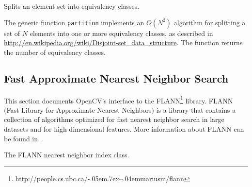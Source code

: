 Splits an element set into equivalency classes.

\begin{description}
\end{description}

The generic function \texttt{partition} implements an $O(N^2)$ algorithm for
splitting a set of $N$ elements into one or more equivalency classes, as described in \url{http://en.wikipedia.org/wiki/Disjoint-set_data_structure}. The function
returns the number of equivalency classes.

\subsection{Fast Approximate Nearest Neighbor Search}

\def\urltilda{\kern -.05em\lower .7ex\hbox{\~{}}\kern .04em}

This section documents OpenCV's interface to the FLANN\footnote{http://people.cs.ubc.ca/\urltilda mariusm/flann} library. FLANN (Fast Library for Approximate Nearest Neighbors) is a library that
contains a collection of algorithms optimized for fast nearest neighbor search in large datasets and for high dimensional features. More 
information about FLANN can be found in \cite{muja_flann_2009}.

The FLANN nearest neighbor index class.

